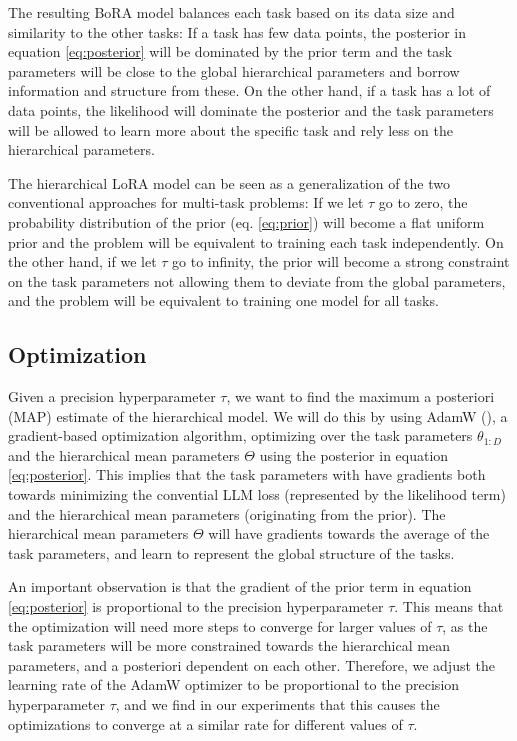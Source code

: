 \documentclass{article}
\begin{document}
The resulting BoRA model balances each task based on its data size and similarity to the other tasks: If a task has few data points, the posterior in equation \ref{eq:posterior} will be dominated by the prior term and the task parameters will be close to the global hierarchical parameters and borrow information and structure from these. On the other hand, if a task has a lot of data points, the likelihood will dominate the posterior and the task parameters will be allowed to learn more about the specific task and rely less on the hierarchical parameters.

The hierarchical LoRA model can be seen as a generalization of the two conventional approaches for multi-task problems:
If we let $\tau$ go to zero, the probability distribution of the prior (eq. \ref{eq:prior}) will become a flat uniform prior and the problem will be equivalent to training each task independently. On the other hand, if we let $\tau$ go to infinity, the prior will become a strong constraint on the task parameters not allowing them to deviate from the global parameters, and the problem will be equivalent to training one model for all tasks.

\subsection{Optimization}
Given a precision hyperparameter $\tau$, we want to find the maximum a posteriori (MAP) estimate of the hierarchical model. 
We will do this by using AdamW (\cite{adamW}), a gradient-based optimization algorithm, optimizing over the task parameters $\theta_{1:D}$ and the hierarchical mean parameters $\Theta$ using the posterior in equation \ref{eq:posterior}.
This implies that the task parameters with have gradients both towards minimizing the convential LLM loss (represented by the likelihood term) and the hierarchical mean parameters (originating from the prior). The hierarchical mean parameters $\Theta$ will have gradients towards the average of the task parameters, and learn to represent the global structure of the tasks.

An important observation is that the gradient of the prior term in equation \ref{eq:posterior} is proportional to the precision hyperparameter $\tau$. This means that the optimization will need more steps to converge for larger values of $\tau$, as the task parameters will be more constrained towards the hierarchical mean parameters, and a posteriori dependent on each other.
Therefore, we adjust the learning rate of the AdamW optimizer to be proportional to the precision hyperparameter $\tau$, and we find in our experiments that this causes the optimizations to converge at a similar rate for different values of $\tau$.
\end{document}
